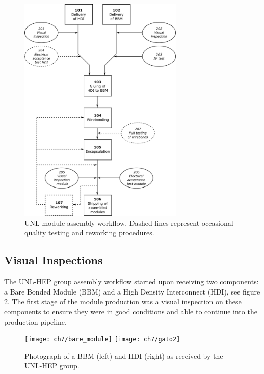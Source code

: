 
\begin{figure}[!h]
	\centering
	\includegraphics[width=0.7\textwidth]{../images/ch7/unl_workflow}
	\caption[UNL module assembly workflow]{UNL module assembly workflow. Dashed lines represent occasional quality testing and reworking procedures\cite{ph1_sop}.}
	\label{fig:unlworkflow}
\end{figure}

\subsection{Visual Inspections}
The UNL-HEP group assembly workflow started upon receiving two components: a Bare Bonded Module (BBM) and a High Density Interconnect (HDI), see figure \ref{fig:bbmyhdi}. The first stage of the module production was a visual inspection on these components to ensure they were in good conditions and able to continue into the production pipeline.

\begin{figure}[!h]
	\centering
	\texttt{[image: ch7/bare\_module]}
	\texttt{[image: ch7/gato2]}
	\caption[Photograph of a BBM and HDI.]{Photograph of a BBM (left) and HDI {}(right) as received by the UNL-HEP group.}
	\label{fig:bbmyhdi}
\end{figure}

